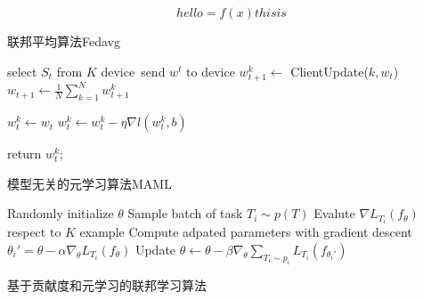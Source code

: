 \documentclass[11pt]{article}
\begin{document}
\begin{CJK*}{UTF8}{gkai}
    $$
    hello = f(x)
    this is 
    $$
    \renewcommand{\thealgorithm}{1}  
    \begin{algorithm}[H]  
    \caption{联邦平均算法Fedavg}  
    \begin{algorithmic}[1]%
        
                \State select $S_t$ from $K$ device\
                \State send $w^t$ to device 
                    \State $w^k_{t+1} \gets $ ClientUpdate($k,w_t$)
                \EndFor
                \State $w_{t+1} \gets \frac{1}{N}\sum_{k=1}^N w_{t+1}^k$
            \EndFor
        \EndFunction

            \State $w_t^k \gets w_t$
                    \State $w_t^k \gets w_t^k - \eta\nabla l(w_t^k,b)$
                \EndFor
            \EndFor
        \EndFunction

        \State return $w_{t}^k$;
    \end{algorithmic}  
    \end{algorithm}

    \begin{algorithm}[H]  
        \caption{模型无关的元学习算法MAML}  
        \begin{algorithmic}[1]%
            \State Randomly initialize $\theta$
                    \State Sample batch of task $T_i\sim p(T)$
                        \State Evalute $\nabla L_{T_i}(f_\theta)$ respect to $K$ example
                        \State Compute adpated parameters with gradient descent
                        \State $\theta_i' = \theta-\alpha\nabla_\theta L_{T_i}(f_\theta)$
                    \EndFor
                    \State Update $\theta \gets \theta-\beta\nabla_\theta\sum_{T_i\sim p_i}L_{T_i}(f_{\theta_i'})$
                \EndWhile
        \end{algorithmic}  
    \end{algorithm}

    \begin{algorithm}[H]  
        \caption{基于贡献度和元学习的联邦学习算法}  
        \begin{algorithmic}[1]%
        

\end{algorithmic}
\end{algorithm}
\end{CJK*}
\end{document}
